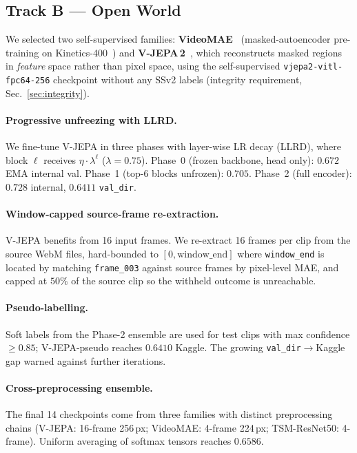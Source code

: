 \documentclass[10pt,twocolumn,letterpaper]{article}
\begin{document}
\subsection{Track B --- Open World}
\label{sec:trackB}

We selected two self-supervised families:
\textbf{VideoMAE}~\cite{tong2022videomae} (masked-autoencoder pre-training on
Kinetics-400~\cite{kay2017kinetics}) and
\textbf{V-JEPA\,2}~\cite{bardes2025vjepa2}, which reconstructs masked regions in
\emph{feature} space rather than pixel space, using the self-supervised
\texttt{vjepa2-vitl-fpc64-256} checkpoint without any SSv2 labels
(integrity requirement, Sec.~\ref{sec:integrity}).

\paragraph{Progressive unfreezing with LLRD.}
We fine-tune V-JEPA in three phases with layer-wise LR decay (LLRD), where
block $\ell$ receives $\eta\cdot\lambda^{\ell}$ ($\lambda{=}0.75$).
Phase~0 (frozen backbone, head only): $0.672$ EMA internal val.
Phase~1 (top-6 blocks unfrozen): $0.705$.
Phase~2 (full encoder): $0.728$ internal, $0.6411$ \texttt{val\_dir}.

\paragraph{Window-capped source-frame re-extraction.}
V-JEPA benefits from 16 input frames. We re-extract 16 frames per clip from
the source WebM files, hard-bounded to $[0, \text{window\_end}]$ where
\texttt{window\_end} is located by matching \texttt{frame\_003} against source
frames by pixel-level MAE, and capped at $50\%$ of the source clip so the
withheld outcome is unreachable.

\paragraph{Pseudo-labelling.}
Soft labels from the Phase-2 ensemble are used for test clips with max
confidence $\geq 0.85$; V-JEPA-pseudo reaches $0.6410$ Kaggle.
The growing \texttt{val\_dir}$\rightarrow$Kaggle gap warned against further iterations.

\paragraph{Cross-preprocessing ensemble.}
The final 14 checkpoints come from three families with distinct preprocessing
chains (V-JEPA: 16-frame 256\,px; VideoMAE: 4-frame 224\,px; TSM-ResNet50:
4-frame). Uniform averaging of softmax tensors reaches $0.6586$.
\end{document}
